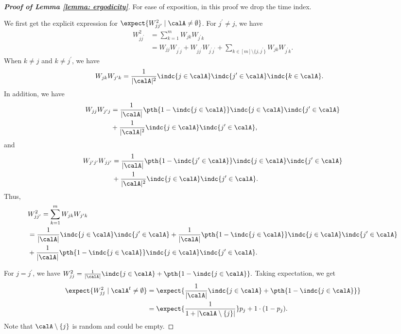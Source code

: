 \documentclass[letterpaper, 10 pt, conference]{ieeeconf}  %
\begin{document}
\begin{proof}[\bf Proof of Lemma \ref{lemma: ergodicity}]
For ease of exposition, in this proof we drop the time index. 




We first get the explicit expression for $\expect{W^2_{jj^{\prime}}\mid \calA \neq \emptyset}$. 
For $j^{\prime}\not=j$, we have 
\begin{align*}
W^2_{jj^{\prime}} & = \sum_{k=1}^m W_{jk}W_{j^{\prime}k} \\
& = W_{jj}W_{j^{\prime}j} + W_{jj^{\prime}}W_{j^{\prime}j^{\prime}} + \sum_{k\in [m]\setminus \{j, j^{\prime}\}} W_{jk}W_{j^{\prime}k}.   
\end{align*}
When $k\not=j$ and $k\not=j^{\prime}$, we have 
\begin{align*}
W_{jk}W_{j^{\prime}k} & = \frac{1}{|\calA|^2} \indc{j\in \calA} \indc{j^{\prime}\in \calA}\indc{k\in \calA}.     
\end{align*}
In addition, we have 
\begin{align*}
W_{jj}W_{j^{\prime}j} & = \frac{1}{|\calA|} \pth{1-\indc{j\in \calA}} \indc{j\in \calA}\indc{j^{\prime}\in \calA} \\
& + \frac{1}{|\calA|^2} \indc{j\in \calA}\indc{j^{\prime}\in \calA}, 
\end{align*}
and 
\begin{align*}
W_{j^{\prime}j^{\prime}}W_{jj^{\prime}} 
& = \frac{1}{|\calA|} \pth{1-\indc{j^{\prime}\in \calA}} \indc{j\in \calA}\indc{j^{\prime}\in \calA} \\
& + \frac{1}{|\calA|^2} \indc{j\in \calA}\indc{j^{\prime}\in \calA}. 
\end{align*} 
Thus, 
\begin{align*}
\label{eq: doubly matrix: off-diagnal}
& W^2_{jj^{\prime}} = \sum_{k=1}^m W_{jk}W_{j^{\prime}k} \\ 
& = \frac{1}{|\calA|}\indc{j\in \calA} \indc{j^{\prime}\in \calA} + \frac{1}{|\calA|} \pth{1-\indc{j\in \calA}} \indc{j\in \calA}\indc{j^{\prime}\in \calA}\\
&+ \frac{1}{|\calA|} \pth{1-\indc{j\in \calA}} \indc{j\in \calA}\indc{j^{\prime}\in \calA}. 
\end{align*}


For $j=j^{\prime}$, we have 
$W^2_{jj} = \frac{1}{|\calA|}\indc{j\in \calA} + \pth{1-\indc{j\in \calA}}. $
Taking expectation, we get 
\begin{align*}
\expect{W^2_{jj}\mid \calA^t\neq\emptyset} 
& = \expect{\frac{1}{|\calA|}\indc{j\in \calA} + \pth{1-\indc{j\in \calA}}}\\
&= \expect{\frac{1}{1+|\calA \setminus \{j\}|}}p_j + 1\cdot (1-p_j).  
\end{align*}
Note that $\calA \setminus \{j\}$ is random and could be empty. 


\end{proof}
\end{document}
